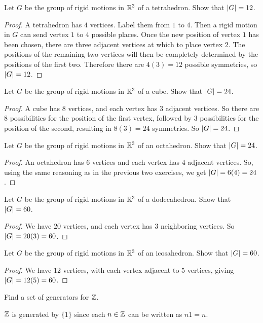  Let $G$ be the group of rigid motions in $\mathbb{R}^3$ of a
tetrahedron. Show that $\lvert{G}\rvert = 12$.
\begin{proof}
  A tetrahedron has $4$ vertices. Label them from $1$ to $4$. Then a
  rigid motion in $G$ can send vertex $1$ to $4$ possible places. Once
  the new position of vertex $1$ has been chosen, there are three
  adjacent vertices at which to place vertex $2$. The positions of the
  remaining two vertices will then be completely determined by the
  positions of the first two. Therefore there are $4(3) = 12$ possible
  symmetries, so $\lvert{G}\rvert = 12$.
\end{proof}

 Let $G$ be the group of rigid motions in $\mathbb{R}^3$ of a
cube. Show that $\lvert{G}\rvert = 24$.
\label{exercise-order-of-rigid-motions-of-a-cube}
\begin{proof}
  A cube has $8$ vertices, and each vertex has $3$ adjacent
  vertices. So there are $8$ possibilities for the position of the
  first vertex, followed by $3$ possibilities for the position of the
  second, resulting in $8(3) = 24$ symmetries. So $\lvert{G}\rvert = 24$.
\end{proof}

 Let $G$ be the group of rigid motions in $\mathbb{R}^3$ of an
octahedron. Show that $\lvert{G}\rvert = 24$.
\label{exercise-order-of-rigid-motions-of-an-octahedron}
\begin{proof}
  An octahedron has $6$ vertices and each vertex has $4$ adjacent
  vertices. So, using the same reasoning as in the previous two
  exercises, we get $\lvert{G}\rvert = 6(4) = 24$.
\end{proof}

 Let $G$ be the group of rigid motions in $\mathbb{R}^3$ of a
dodecahedron. Show that $\lvert{G}\rvert = 60$.
\begin{proof}
  We have $20$ vertices, and each vertex has $3$ neighboring
  vertices. So $\lvert{G}\rvert = 20(3) = 60$.
\end{proof}

 Let $G$ be the group of rigid motions in $\mathbb{R}^3$ of an
icosahedron. Show that $\lvert{G}\rvert = 60$.
\begin{proof}
  We have $12$ vertices, with each vertex adjacent to $5$ vertices,
  giving $\lvert{G}\rvert = 12(5) = 60$.
\end{proof}

 Find a set of generators for $\mathbb{Z}$.
\begin{solution}
  $\mathbb{Z}$ is generated by $\{1\}$ since each $n\in\mathbb{Z}$ can be written as
  $n1 = n$.
\end{solution}

